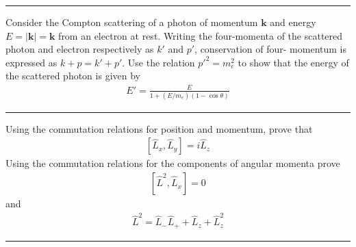\noindent\rule{7in}{1.5pt}


\begin{problem}{2.14}
Consider the Compton scattering of a photon of momentum $\mathbf{k}$ and energy $E = \left| \mathbf{k} \right| = \mathbf{k}$ from an electron at rest.
Writing the four-momenta of the scattered photon and electron respectively as $k'$ and $p'$, conservation of four- momentum is expressed as $k + p = k' + p'$.
Use the relation $p'^2 = m_e^2$ to show that the energy of the scattered photon is given by
\begin{align*}
    E' = \frac{E}{1+\left( E/m_e \right)\left( 1-\cos\theta \right)}
\end{align*}
\end{problem}
\begin{solution}
            
\end{solution}
    
\noindent\rule{7in}{1.5pt}


\begin{problem}{2.15}
Using the commutation relations for position and momentum, prove that
\begin{align*}
    \left[ \hat{L}_x, \hat{L}_y \right] = i \hat{L}_z
\end{align*}
Using the commutation relations for the components of angular momenta prove
\begin{align*}
    \left[ \hat{L}^2, \hat{L}_x \right] = 0
\end{align*}
and
\begin{align*}
    \hat{L}^2 = \hat{L}_-\hat{L}_+ + \hat{L}_z + \hat{L}_z^2
\end{align*}
\end{problem}
\begin{solution}
            
\end{solution}
    
\noindent\rule{7in}{1.5pt}


